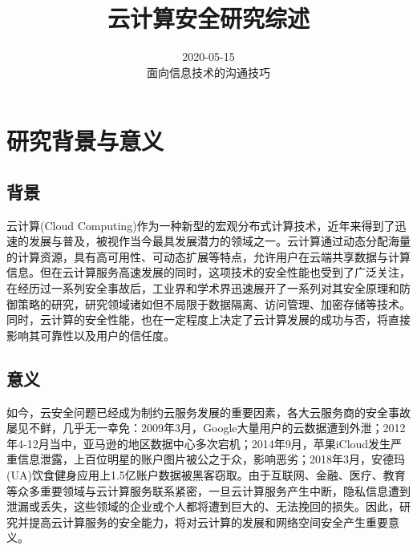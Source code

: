 \documentclass[a4paper, 12pt, conference]{ieeeconf}      %
\title{\LARGE %
\heiti
云计算安全研究综述
}
\author{2020-05-15 \\%
面向信息技术的沟通技巧
}
\begin{document}
\maketitle
\thispagestyle{empty}
\pagestyle{empty}



\section{研究背景与意义}

\subsection{背景}
云计算(Cloud Computing)作为一种新型的宏观分布式计算技术，近年来得到了迅速的发展与普及，被视作当今最具发展潜力的领域之一。云计算通过动态分配海量的计算资源，具有高可用性、可动态扩展等特点，允许用户在云端共享数据与计算信息。但在云计算服务高速发展的同时，这项技术的安全性能也受到了广泛关注，在经历过一系列安全事故后，工业界和学术界迅速展开了一系列对其安全原理和防御策略的研究，研究领域诸如但不局限于数据隔离、访问管理、加密存储等技术。同时，云计算的安全性能，也在一定程度上决定了云计算发展的成功与否，将直接影响其可靠性以及用户的信任度。
\subsection{意义}
如今，云安全问题已经成为制约云服务发展的重要因素，各大云服务商的安全事故屡见不鲜，几乎无一幸免：2009年3月，Google大量用户的云数据遭到外泄；2012年4-12月当中，亚马逊的地区数据中心多次宕机；2014年9月，苹果iCloud发生严重信息泄露，上百位明星的账户图片被公之于众，影响恶劣；2018年3月，安德玛(UA)饮食健身应用上1.5亿账户数据被黑客窃取。由于互联网、金融、医疗、教育等众多重要领域与云计算服务联系紧密，一旦云计算服务产生中断，隐私信息遭到泄漏或丢失，这些领域的企业或个人都将遭到巨大的、无法挽回的损失。因此，研究并提高云计算服务的安全能力，将对云计算的发展和网络空间安全产生重要意义。



\end{document}
